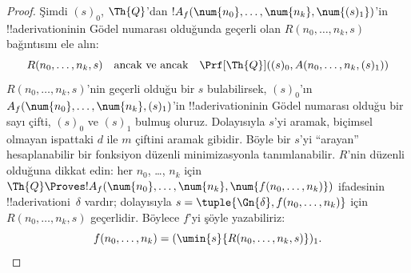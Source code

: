 \begin{proof}
Şimdi $(s)_0$, $\Th{Q}$'dan
$!A_f(\num{n_0}, \dots, \num{n_k}, \num{(s)_1})$'in !!a{derivation}{}inin
Gödel numarası olduğunda geçerli olan $R(n_0,\dots,n_k,s)$ bağıntısını
ele alın:
\[
R(n_0, \dots, n_k, s) \quad\text{ancak ve ancak}\quad \Prf[\Th{Q}]((s)_0, A(n_0,
\dots, n_k, (s)_1))
\]
$R(n_0,\dots,n_k,s)$'nin geçerli olduğu bir $s$ bulabilirsek,
$(s)_0$'ın $A_f(\num{n_0}, \dots, \num{n_k}, (s)_1)$'in
!!a{derivation}{}inin Gödel numarası olduğu bir sayı çifti, $(s)_0$ ve
$(s)_1$ bulmuş oluruz. Dolayısıyla $s$'yi aramak, biçimsel olmayan ispattaki
$d$ ile $m$ çiftini aramak gibidir. Böyle bir $s$'yi ``arayan'' hesaplanabilir
bir fonksiyon düzenli minimizasyonla tanımlanabilir. $R$'nin düzenli olduğuna
dikkat edin: her $n_0$, \dots, $n_k$ için
$\Th{Q} \Proves !A_f(\num{n_0}, \dots, \num{n_k},
\num{f(n_0, \dots, n_k)})$ ifadesinin !!a{derivation}{}i~$\delta$ vardır;
dolayısıyla $s=\tuple{\Gn{\delta},f(n_0,\dots,n_k)}$ için
$R(n_0,\dots,n_k,s)$ geçerlidir. Böylece $f$'yi şöyle yazabiliriz:
\[
f(n_0,\dots,n_{k}) = (\umin{s}{R(n_0, \dots, n_k, s)})_1.
\]
\end{proof}

